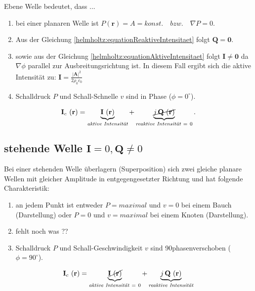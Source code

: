 Ebene Welle bedeutet, dass ...
\begin{enumerate}
\item bei einer planaren Welle ist $P (\mathbf{r}) = A = konst.\quad bzw. \quad \nabla P = 0$.
\item Aus der Gleichung \eqref{helmholtz:equationReaktiveIntensitaet} folgt $\mathbf{Q} = \mathbf{0}$.
\item sowie aus der Gleichung \eqref{helmholtz:equationAktiveIntensitaet} folgt $\mathbf{I} \neq \mathbf{0}$ da $ \nabla \phi$ parallel zur Ausbreitungsrichtung ist. In diesem Fall ergibt sich die aktive Intensität zu: $\mathbf{I} = \frac{|\mathbf{A}|^2}{2 \rho_0 c_0}$
\item Schalldruck $P$ und Schall-Schnelle $v$ sind in Phase ($\phi = 0^{\circ}$).
\end{enumerate}


\begin{equation}
	\mathbf{I}_c ~(\mathbf{r}) = \underbrace{\mathbf{I}~(\mathbf{r})}_{\textit{aktive Intensität}} + \underbrace{ \cancel{j\,\mathbf{Q}~(\mathbf{r})}}_{\textit{reaktive~Intensität}~=~0}.
	\label{helmholtz:equationIntensitaetComplexplanar}
\end{equation}	


\subsection{stehende Welle $\mathbf{I} = 0,\mathbf{Q} \neq 0$
\label{helmholtz:subsection:stehendeWelle}}

Bei einer stehenden Welle überlagern (Superposition) sich zwei gleiche planare Wellen mit gleicher Amplitude in entgegengesetzter Richtung und hat folgende Charakteristik:

\begin{enumerate}
\item an jedem Punkt ist entweder  $P = maximal$ und $v = 0$ bei einem Bauch (Darstellung) oder $P = 0$  und $ v = maximal$ bei einem Knoten (Darstellung).
\item fehlt noch was ??
\item Schalldruck $P$ und Schall-Geschwindigkeit $v$ sind 90\textdegree phasenverschoben ($\phi = 90^{\circ}$).
\end{enumerate}



\begin{equation}
	\mathbf{I}_c ~(\mathbf{r}) = \underbrace{\cancel{\mathbf{I}~(\mathbf{r})}}_{\textit{aktive Intensität}~=~0} + \underbrace{j\,\mathbf{Q}~(\mathbf{r})}_{\textit{reaktive~Intensität}}
	\label{helmholtz:equationIntensitaetComplexStehend}
\end{equation}	

